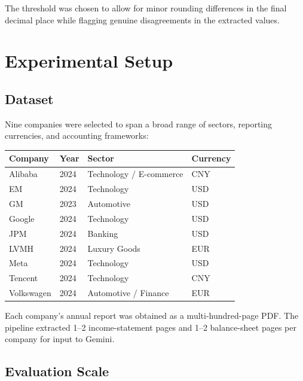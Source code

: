 \documentclass[12pt, a4paper]{article}
\begin{document}
The threshold was chosen to allow for minor rounding differences in the final
decimal place while flagging genuine disagreements in the extracted values.

\section{Experimental Setup}
\label{sec:setup}

\subsection{Dataset}

Nine companies were selected to span a broad range of sectors, reporting
currencies, and accounting frameworks:

\begin{center}
\begin{tabular}{llll}
\toprule
\textbf{Company} & \textbf{Year} & \textbf{Sector} & \textbf{Currency} \\
\midrule
Alibaba  & 2024 & Technology / E-commerce & CNY \\
EM       & 2024 & Technology              & USD \\
GM       & 2023 & Automotive              & USD \\
Google   & 2024 & Technology              & USD \\
JPM      & 2024 & Banking                 & USD \\
LVMH     & 2024 & Luxury Goods            & EUR \\
Meta     & 2024 & Technology              & USD \\
Tencent  & 2024 & Technology              & CNY \\
Volkswagen & 2024 & Automotive / Finance  & EUR \\
\bottomrule
\end{tabular}
\end{center}

Each company's annual report was obtained as a multi-hundred-page PDF.  The
pipeline extracted 1--2 income-statement pages and 1--2 balance-sheet pages per
company for input to Gemini.

\subsection{Evaluation Scale}
\end{document}
